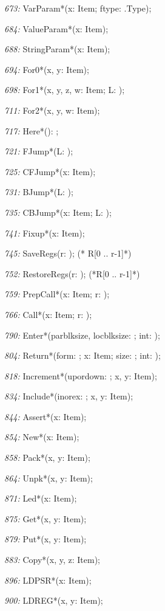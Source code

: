 \item{\it 673:} VarParam*(\VAR x: Item; ftype: \ORB.Type);
\item{\it 684:} ValueParam*(\VAR x: Item);
\item{\it 688:} StringParam*(\VAR x: Item);
\item{\it 694:} For0*(\VAR x, y: Item);
\item{\it 698:} For1*(\VAR x, y, z, w: Item; \VAR L: \LONGINT);
\item{\it 711:} For2*(\VAR x, y, w: Item);
\item{\it 717:} Here*(): \LONGINT;
\item{\it 721:} FJump*(\VAR L: \LONGINT);
\item{\it 725:} CFJump*(\VAR x: Item);
\item{\it 731:} BJump*(L: \LONGINT);
\item{\it 735:} CBJump*(\VAR x: Item; L: \LONGINT);
\item{\it 741:} Fixup*(\VAR x: Item);
\item{\it 745:} SaveRegs(r: \LONGINT);  (* R[0 .. r-1]*)
\item{\it 752:} RestoreRegs(r: \LONGINT); (*R[0 .. r-1]*)
\item{\it 759:} PrepCall*(\VAR x: Item; \VAR r: \LONGINT);
\item{\it 766:} Call*(\VAR x: Item; r: \LONGINT);
\item{\it 790:} Enter*(parblksize, locblksize: \LONGINT; int: \BOOLEAN);
\item{\it 804:} Return*(form: \INTEGER; \VAR x: Item; size: \LONGINT; int: \BOOLEAN);
\item{\it 818:} Increment*(upordown: \LONGINT; \VAR x, y: Item);
\item{\it 834:} Include*(inorex: \LONGINT; \VAR x, y: Item);
\item{\it 844:} Assert*(\VAR x: Item);
\item{\it 854:} New*(\VAR x: Item);
\item{\it 858:} Pack*(\VAR x, y: Item);
\item{\it 864:} Unpk*(\VAR x, y: Item);
\item{\it 871:} Led*(\VAR x: Item);
\item{\it 875:} Get*(\VAR x, y: Item);
\item{\it 879:} Put*(\VAR x, y: Item);
\item{\it 883:} Copy*(\VAR x, y, z: Item);
\item{\it 896:} LDPSR*(\VAR x: Item);
\item{\it 900:} LDREG*(\VAR x, y: Item);
